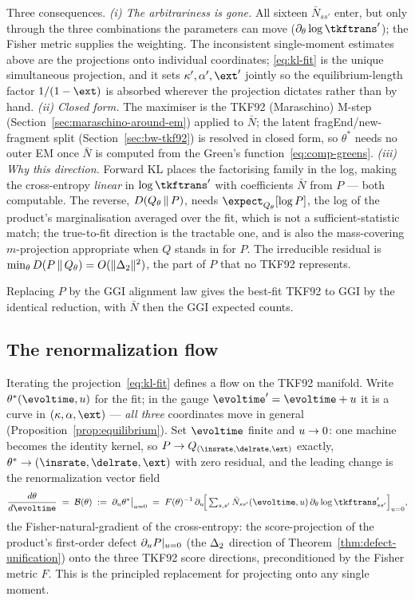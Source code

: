 Three consequences.  \emph{(i) The arbitrariness is gone.}  All sixteen
$\bar N_{ss'}$ enter, but only through the three combinations the
parameters can move ($\partial_\theta\log\tkftrans'$); the Fisher metric
supplies the weighting.  The inconsistent single-moment estimates above are
the projections onto individual coordinates; \eqref{eq:kl-fit} is the unique
simultaneous projection, and it sets $\kappa',\alpha',\ext'$ jointly so the
equilibrium-length factor $1/(1-\ext)$ is absorbed wherever the projection
dictates rather than by hand.  \emph{(ii) Closed form.}  The maximiser is
the TKF92 (Maraschino) M-step (Section~\ref{sec:maraschino-around-em})
applied to $\bar N$; the latent fragEnd/new-fragment split
(Section~\ref{sec:bw-tkf92}) is resolved in closed form, so $\theta^*$ needs
no outer EM once $\bar N$ is computed from the Green's
function~\eqref{eq:comp-greens}.  \emph{(iii) Why this direction.}  Forward
KL places the factorising family in the log, making the cross-entropy
\emph{linear} in $\log\tkftrans'$ with coefficients $\bar N$ from $P$ ---
both computable.  The reverse, $D\!\left(Q_\theta\,\middle\|\,P\right)$, needs
$\expect_{Q_\theta}[\log P]$, the log of the product's marginalisation
averaged over the fit, which is not a sufficient-statistic match; the
true-to-fit direction is the tractable one, and is also the mass-covering
$m$-projection appropriate when $Q$ stands in for $P$.  The irreducible
residual is $\min_\theta D\!\left(P\,\middle\|\,Q_\theta\right)=O(\|\Delta_2\|^2)$, the part of
$P$ that no TKF92 represents.

Replacing $P$ by the GGI alignment law gives the best-fit TKF92 to GGI by
the identical reduction, with $\bar N$ then the GGI expected counts.

\subsection{The renormalization flow}
\label{sec:comp-flow}

Iterating the projection~\eqref{eq:kl-fit} defines a flow on the TKF92
manifold.  Write $\theta^*(\evoltime,\evolu)$ for the fit; in the gauge
$\evoltime'=\evoltime+\evolu$ it is a curve in $(\kappa,\alpha,\ext)$ ---
\emph{all three} coordinates move in general (Proposition~\ref{prop:equilibrium}).
Set $\evoltime$ finite and $u\to0$: one machine becomes the identity
kernel, so $P\to Q_{(\insrate,\delrate,\ext)}$ exactly,
$\theta^*\to(\insrate,\delrate,\ext)$ with zero residual, and the leading
change is the renormalization vector field
\begin{equation}
\label{eq:beta-function}
\frac{d\theta}{d\evoltime} \;=\; \betafn(\theta)
\;:=\; \partial_\evolu\theta^*\big|_{\evolu=0}
\;=\; F(\theta)^{-1}\,
 \partial_\evolu\!\Big[\textstyle\sum_{s,s'}\bar N_{ss'}(\evoltime,\evolu)\,
   \partial_\theta\log\tkftrans'_{ss'}\Big]_{\evolu=0},
\end{equation}
the Fisher-natural-gradient of the cross-entropy: the score-projection of
the product's first-order defect $\partial_u P|_{u=0}$ (the
$\Delta_2$ direction of Theorem~\ref{thm:defect-unification}) onto the
three TKF92 score directions, preconditioned by the Fisher metric $F$.
This is the principled replacement for projecting onto any single moment.

